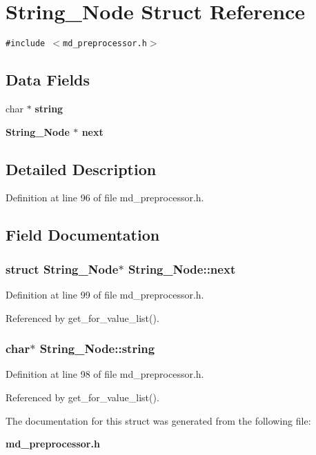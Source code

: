 \section{String\_\-Node Struct Reference}
\label{structString__Node}
{\tt \#include $<$md\_\-preprocessor.h$>$}

\subsection*{Data Fields}
\begin{CompactItemize}
\item 
char $\ast$ \bf{string}
\item 
\bf{String\_\-Node} $\ast$ \bf{next}
\end{CompactItemize}


\subsection{Detailed Description}




Definition at line 96 of file md\_\-preprocessor.h.

\subsection{Field Documentation}
\subsubsection{\setlength{\rightskip}{0pt plus 5cm}struct \bf{String\_\-Node}$\ast$ \bf{String\_\-Node::next}}\label{structString__Node_85f2cf608f9c71fa0c5008af13c76cdf}




Definition at line 99 of file md\_\-preprocessor.h.

Referenced by get\_\-for\_\-value\_\-list().
\subsubsection{\setlength{\rightskip}{0pt plus 5cm}char$\ast$ \bf{String\_\-Node::string}}\label{structString__Node_a5482b05fc47b8918b7d686dab3e7fc2}




Definition at line 98 of file md\_\-preprocessor.h.

Referenced by get\_\-for\_\-value\_\-list().

The documentation for this struct was generated from the following file:\begin{CompactItemize}
\item 
\bf{md\_\-preprocessor.h}\end{CompactItemize}
